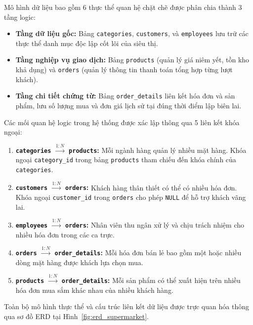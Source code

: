 \documentclass[12pt,a4paper]{report}
\begin{document}
Mô hình dữ liệu bao gồm 6 thực thể quan hệ chặt chẽ được phân chia thành 3 tầng logic:
\begin{itemize}[itemsep=1pt, topsep=2pt, parsep=0pt, partopsep=0pt]
    \item \textbf{Tầng dữ liệu gốc:} Bảng \texttt{categories}, \texttt{customers}, và \texttt{employees} lưu trữ các thực thể danh mục độc lập cốt lõi của siêu thị.
    \item \textbf{Tầng nghiệp vụ giao dịch:} Bảng \texttt{products} (quản lý giá niêm yết, tồn kho khả dụng) và \texttt{orders} (quản lý thông tin thanh toán tổng hợp từng lượt khách).
    \item \textbf{Tầng chi tiết chứng từ:} Bảng \texttt{order\_details} liên kết hóa đơn và sản phẩm, lưu số lượng mua và đơn giá lịch sử tại đúng thời điểm lập biên lai.
\end{itemize}

Các mối quan hệ logic trong hệ thống được xác lập thông qua 5 liên kết khóa ngoại:
\begin{enumerate}[itemsep=1pt, topsep=2pt, parsep=0pt, partopsep=0pt]
    \item \textbf{\texttt{categories} $\xrightarrow{1:N}$ \texttt{products}:} Mỗi ngành hàng quản lý nhiều mặt hàng. Khóa ngoại \texttt{category\_id} trong bảng \texttt{products} tham chiếu đến khóa chính của \texttt{categories}.
    \item \textbf{\texttt{customers} $\xrightarrow{1:N}$ \texttt{orders}:} Khách hàng thân thiết có thể có nhiều hóa đơn. Khóa ngoại \texttt{customer\_id} trong \texttt{orders} cho phép \texttt{NULL} để hỗ trợ khách vãng lai.
    \item \textbf{\texttt{employees} $\xrightarrow{1:N}$ \texttt{orders}:} Nhân viên thu ngân xử lý và chịu trách nhiệm cho nhiều hóa đơn trong các ca trực.
    \item \textbf{\texttt{orders} $\xrightarrow{1:N}$ \texttt{order\_details}:} Mỗi hóa đơn bán lẻ bao gồm một hoặc nhiều dòng mặt hàng được khách lựa chọn mua.
    \item \textbf{\texttt{products} $\xrightarrow{1:N}$ \texttt{order\_details}:} Mỗi sản phẩm có thể xuất hiện trên nhiều hóa đơn mua sắm khác nhau của nhiều khách hàng.
\end{enumerate}

Toàn bộ mô hình thực thể và cấu trúc liên kết dữ liệu được trực quan hóa thông qua sơ đồ ERD tại Hình~\ref{fig:erd_supermarket}.
\end{document}
